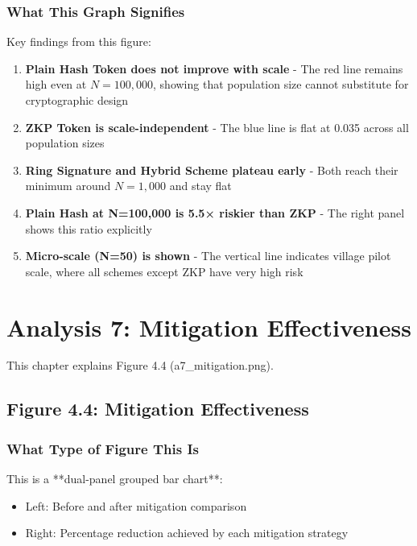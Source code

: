 \documentclass[12pt,a4paper,oneside,openany]{report}
\begin{document}
\subsection{What This Graph Signifies}

Key findings from this figure:

\begin{enumerate}
    \item \textbf{Plain Hash Token does not improve with scale} - The red line remains high even at $N=100,000$, showing that population size cannot substitute for cryptographic design
    \item \textbf{ZKP Token is scale-independent} - The blue line is flat at 0.035 across all population sizes
    \item \textbf{Ring Signature and Hybrid Scheme plateau early} - Both reach their minimum around $N=1,000$ and stay flat
    \item \textbf{Plain Hash at N=100,000 is 5.5× riskier than ZKP} - The right panel shows this ratio explicitly
    \item \textbf{Micro-scale (N=50) is shown} - The vertical line indicates village pilot scale, where all schemes except ZKP have very high risk
\end{enumerate}

\chapter{Analysis 7: Mitigation Effectiveness}
\label{chap:a7}

This chapter explains Figure 4.4 (a7\_mitigation.png).

\section{Figure 4.4: Mitigation Effectiveness}
\label{sec:f4.4}

\subsection{What Type of Figure This Is}
This is a **dual-panel grouped bar chart**:
\begin{itemize}
    \item Left: Before and after mitigation comparison
    \item Right: Percentage reduction achieved by each mitigation strategy
\end{itemize}
\end{document}
